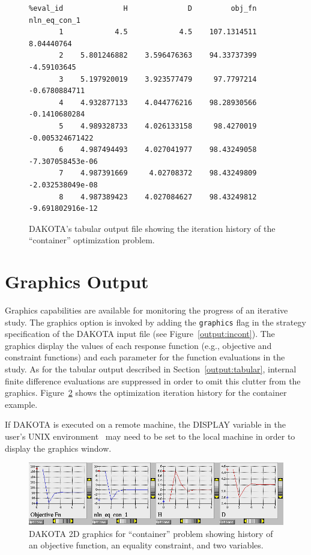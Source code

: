 \begin{figure}
\begin{bigbox}
\begin{small}
\begin{verbatim}
%eval_id              H              D         obj_fn   nln_eq_con_1 
       1            4.5            4.5    107.1314511     8.04440764 
       2    5.801246882    3.596476363    94.33737399    -4.59103645 
       3    5.197920019    3.923577479     97.7797214  -0.6780884711 
       4    4.932877133    4.044776216    98.28930566  -0.1410680284 
       5    4.989328733    4.026133158     98.4270019 -0.005324671422 
       6    4.987494493    4.027041977    98.43249058 -7.307058453e-06 
       7    4.987391669     4.02708372    98.43249809 -2.032538049e-08 
       8    4.987389423    4.027084627    98.43249812 -9.691802916e-12 
\end{verbatim}
\end{small}
\end{bigbox}
\caption{DAKOTA's tabular output file showing the iteration history of
the ``container'' optimization problem.} \label{output:tabcont}
\end{figure}

\section{Graphics Output}\label{output:graphics}

Graphics capabilities are available for monitoring the progress of an
iterative study. The graphics option is invoked by adding the
\texttt{graphics} flag in the strategy specification of the DAKOTA
input file (see Figure~\ref{output:incont}). The graphics display
the values of each response function (e.g., objective and constraint
functions) and each parameter for the function evaluations in the
study. As for the tabular output described in
Section~\ref{output:tabular}, internal finite difference evaluations
are suppressed in order to omit this clutter from the graphics.
Figure~\ref{output:2dcont} shows the optimization iteration history
for the container example.

If DAKOTA is executed on a remote machine, the DISPLAY variable in the
user's UNIX environment~\cite{Gil92} may need to be set to the local
machine in order to display the graphics window. 

\begin{figure}
\centering
\includegraphics[width=\textwidth]{images/container_graphic}
\caption{DAKOTA 2D graphics for ``container'' problem showing history of
an objective function, an equality constraint, and two variables.}
\label{output:2dcont}
\end{figure}


